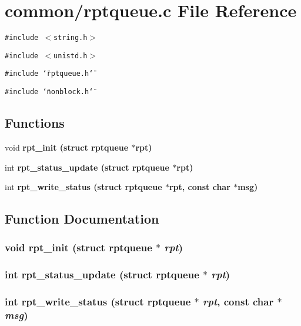 \section{common/rptqueue.c File Reference}
\label{rptqueue_8c}
{\tt \#include $<$string.h$>$}\par
{\tt \#include $<$unistd.h$>$}\par
{\tt \#include \char`\"{}rptqueue.h\char`\"{}}\par
{\tt \#include \char`\"{}nonblock.h\char`\"{}}\par
\subsection*{Functions}
\begin{CompactItemize}
\item 
void \bf{rpt\_\-init} (struct \bf{rptqueue} $\ast$rpt)
\item 
int \bf{rpt\_\-status\_\-update} (struct \bf{rptqueue} $\ast$rpt)
\item 
int \bf{rpt\_\-write\_\-status} (struct \bf{rptqueue} $\ast$rpt, const char $\ast$msg)
\end{CompactItemize}


\subsection{Function Documentation}
\subsubsection{\setlength{\rightskip}{0pt plus 5cm}void rpt\_\-init (struct \bf{rptqueue} $\ast$ {\em rpt})}\label{rptqueue_8c_d35c548a217774330d91baeed46a3606}


\subsubsection{\setlength{\rightskip}{0pt plus 5cm}int rpt\_\-status\_\-update (struct \bf{rptqueue} $\ast$ {\em rpt})}\label{rptqueue_8c_cc96d7628571abc803f655bf97a1020b}


\subsubsection{\setlength{\rightskip}{0pt plus 5cm}int rpt\_\-write\_\-status (struct \bf{rptqueue} $\ast$ {\em rpt}, const char $\ast$ {\em msg})}\label{rptqueue_8c_9acf785ecd74f52b16096a301dec2906}


